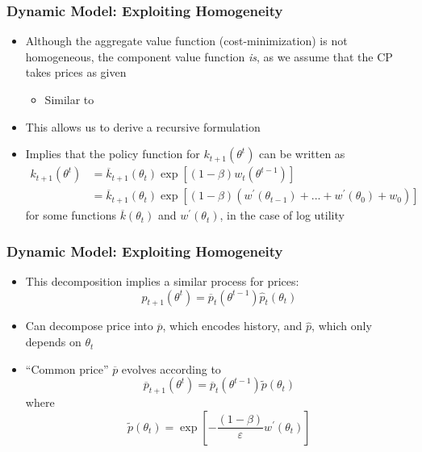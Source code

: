\documentclass{beamer}
\begin{document}
\begin{frame}
    \frametitle{Dynamic Model: Exploiting Homogeneity}

    \begin{itemize}
        \item Although the aggregate value function (cost-minimization) is not homogeneous, the component value function \textit{is}, as we assume that the CP takes prices as given 
        \begin{itemize}
            \item Similar to \cite{angeletos2007uninsured} 
        \end{itemize} 
        \item This allows us to derive a recursive formulation 
        \item Implies that the policy function for \( k_{t+1}\left( \theta^t \right) \) can be written as 
        \begin{align*}
            k_{t+1}\left(\theta^{t}\right) & =\overline{k}_{t+1}\left(\theta_{t}\right)\exp\left[\left(1-\beta\right)w_{t}\left(\theta^{t-1}\right)\right]\\
             & =\overline{k}_{t+1}\left(\theta_{t}\right)\exp\left[\left(1-\beta\right)\left(w^{\prime}\left(\theta_{t-1}\right)+...+w^{\prime}\left(\theta_{0}\right)+w_{0}\right)\right]
            \end{align*}
            for some functions \( \overline{k}\left( \theta_t \right) \) and \( w^\prime\left( \theta_t \right) \), in the case of log utility
    \end{itemize}

\end{frame}

\begin{frame}
    \frametitle{Dynamic Model: Exploiting Homogeneity}

    \begin{itemize}
        \item This decomposition implies a similar process for prices: 
        \begin{equation*}
            p_{t+1}\left(\theta^{t}\right)=\overline{p}_{t}\left(\theta^{t-1}\right)\hat{p}_{t}\left(\theta_{t}\right)
        \end{equation*}
        \item Can decompose price into \( \overline{p} \), which encodes history, and \( \hat{p} \), which only depends on \( \theta_t \)
        \item ``Common price'' \( \overline{p} \) evolves according to 
        \begin{equation*}
            \overline{p}_{t+1}\left(\theta^{t}\right)=\overline{p}_{t}\left(\theta^{t-1}\right)\tilde{p}\left(\theta_{t}\right)
        \end{equation*} 
        where 
        \begin{equation*}
            \tilde{p}\left(\theta_t\right)=\exp\left[-\frac{\left(1-\beta\right)}{\varepsilon}w^{\prime}\left(\theta_t\right)\right]
        \end{equation*}
            
    \end{itemize}

\end{frame}
\end{document}
